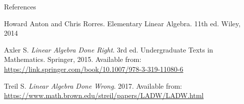 \documentclass [aspectratio=169]{beamer}
\begin{document}
\begin{frame}{References}

Howard Anton and Chris Rorres. Elementary Linear Algebra. 11th ed. Wiley, 2014

\vspace{1em}

Axler S. \textit{Linear Algebra Done Right}. 3rd ed. Undergraduate Texts in Mathematics. Springer, 2015.
Available from: \href{https://link.springer.com/book/10.1007/978-3-319-11080-6}{https://link.springer.com/book/10.1007/978-3-319-11080-6} 

\vspace{1em}


\indent Treil S. \textit{Linear Algebra Done Wrong}. 2017. Available from: \href{https://www.math.brown.edu/streil/papers/LADW/LADW.html}{https://www.math.brown.edu/streil/papers/LADW/LADW.html}
\end{frame}
\end{document}
